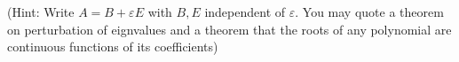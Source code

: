 \documentclass{article}
\begin{document}
\begin{description}
(Hint: Write $A=B+ \varepsilon E$ with $B,E$ independent
of $\varepsilon$. You may quote a theorem on perturbation of eignvalues
and a theorem that the roots of any polynomial are continuous functions of
its coefficients)





\end{description}    
\end{document}
